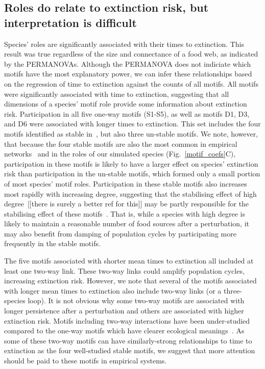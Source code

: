 \documentclass[12pt]{article}
\begin{document}
  \subsection*{Roles do relate to extinction risk, but interpretation is difficult}

      Species' roles are significantly associated with their times to extinction. This result was true regardless of the size and connectance of a food web, as indicated by the PERMANOVAs.
    Although the PERMANOVA does not indiciate which motifs have the most explanatory power, we can infer these relationships based on the regression of time to extinction against the counts of all motifs.
    All motifs were significantly associated with time to extinction, suggesting that all dimensions of a species' motif role provide some information about extinction risk.
    Participation in all five one-way motifs (S1-S5), as well as motifs D1, D3, and D6 were associated with longer times to extinction. 
    This set includes the four motifs identified as stable in~\citet{Stouffer2007,Borrelli2015a}, but also three un-stable motifs. 
    We note, however, that because the four stable motifs are also the most common in empirical networks~\citep{Stouffer2007} and in the roles of our simulated species (Fig.~\ref{motif_coefs}C), participation in these motifs is likely to have a larger effect on species' extinction risk than participation in the un-stable motifs, which formed only a small portion of most species' motif roles.
    Participation in these stable motifs also increases most rapidly with increasing degree, suggesting that the stabilising effect of high degree~\citep{Cirtwill2016a}[[there is surely a better ref for this]] may be partly responsible for the stabilising effect of these motifs~\citep{Stouffer2007,Borrelli2015a}.
    That is, while a species with high degree is likely to maintain a reasonable number of food sources after a perturbation, it may also benefit from damping of population cycles by participating more frequently in the stable motifs.


        The five motifs associated with shorter mean times to extinction all included at least one two-way link. 
        These two-way links could amplify population cycles, increasing extinction risk.
        However, we note that several of the motifs associated with longer mean times to extinction also include two-way links (or a three-species loop).
    It is not obvious why some two-way motifs are associated with longer persistence after a perturbation and others are associated with higher extinction risk.
    Motifs including two-way interactions have been under-studied compared to the one-way motifs which have clearer ecological meanings~\citep{Bascompte2005,Cirtwill2015}.
    As some of these two-way motifs can have similarly-strong relationships to time to extinction as the four well-studied stable motifs, we suggest that more attention should be paid to these motifs in empirical systems.
\end{document}
